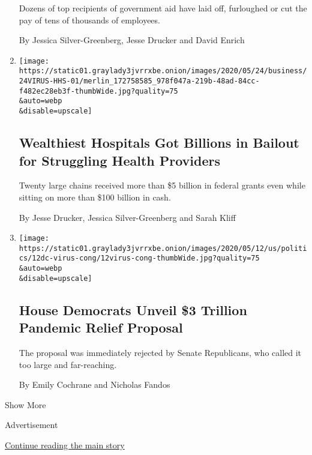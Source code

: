 \begin{enumerate}
  Dozens of top recipients of government aid have laid off, furloughed
  or cut the pay of tens of thousands of employees.

  By Jessica Silver-Greenberg, Jesse Drucker and David Enrich
\item
  \href{/2020/05/25/business/coronavirus-hospitals-bailout.html}{}

  \texttt{[image: https://static01.graylady3jvrrxbe.onion/images/2020/05/24/business/24VIRUS-HHS-01/merlin\_172758585\_978f047a-219b-48ad-84cc-f482ec28eb3f-thumbWide.jpg?quality=75\\\&auto=webp\\\&disable=upscale]}

  \hypertarget{wealthiest-hospitals-got-billions-in-bailout-for-struggling-health-providers}{%
  \subsection{Wealthiest Hospitals Got Billions in Bailout for
  Struggling Health
  Providers}\label{wealthiest-hospitals-got-billions-in-bailout-for-struggling-health-providers}}

  Twenty large chains received more than \$5 billion in federal grants
  even while sitting on more than \$100 billion in cash.

  By Jesse Drucker, Jessica Silver-Greenberg and Sarah Kliff
\item
  \href{/2020/05/12/us/politics/democrats-coronavirus-relief-proposal.html}{}

  \texttt{[image: https://static01.graylady3jvrrxbe.onion/images/2020/05/12/us/politics/12dc-virus-cong/12virus-cong-thumbWide.jpg?quality=75\\\&auto=webp\\\&disable=upscale]}

  \hypertarget{house-democrats-unveil-3-trillion-pandemic-relief-proposal}{%
  \subsection{House Democrats Unveil \$3 Trillion Pandemic Relief
  Proposal}\label{house-democrats-unveil-3-trillion-pandemic-relief-proposal}}

  The proposal was immediately rejected by Senate Republicans, who
  called it too large and far-reaching.

  By Emily Cochrane and Nicholas Fandos
\end{enumerate}

Show More

Advertisement

\protect\hyperlink{after-mid2}{Continue reading the main story}

